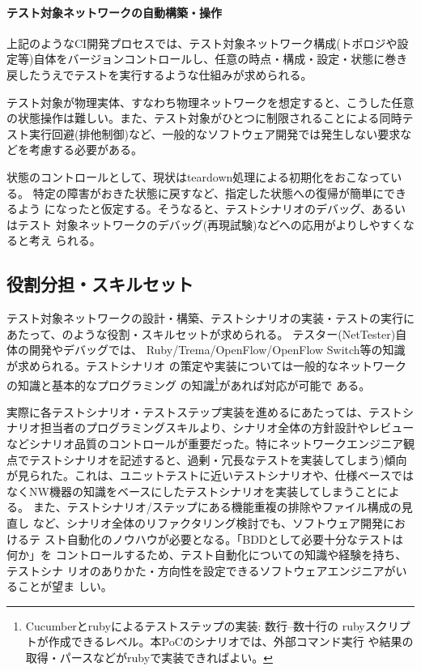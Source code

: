     \paragraph{テスト対象ネットワークの自動構築・操作}
上記のようなCI開発プロセスでは、テスト対象ネットワーク構成(トポロジや設
定等)自体をバージョンコントロールし、任意の時点・構成・設定・状態に巻き
戻したうえでテストを実行するような仕組みが求められる。

テスト対象が物理実体、すなわち物理ネットワークを想定すると、こうした任意
の状態操作は難しい。また、テスト対象がひとつに制限されることによる同時テ
スト実行回避(排他制御)など、一般的なソフトウェア開発では発生しない要求な
どを考慮する必要がある。

状態のコントロールとして、現状はteardown処理による初期化をおこなっている。
特定の障害がおきた状態に戻すなど、指定した状態への復帰が簡単にできるよう
になったと仮定する。そうなると、テストシナリオのデバッグ、あるいはテスト
対象ネットワークのデバッグ(再現試験)などへの応用がよりしやすくなると考え
られる。

  \subsection{役割分担・スキルセット}

テスト対象ネットワークの設計・構築、テストシナリオの実装・テストの実行に
あたって、のような役割・スキルセットが求められる。
テスター(NetTester)自体の開発やデバッグでは、
Ruby/Trema/OpenFlow/OpenFlow Switch等の知識が求められる。テストシナリオ
の策定や実装については一般的なネットワークの知識と基本的なプログラミング
の知識\footnote{Cucumberとrubyによるテストステップの実装: 数行--数十行の
rubyスクリプトが作成できるレベル。本PoCのシナリオでは、外部コマンド実行
や結果の取得・パースなどがrubyで実装できればよい。}があれば対応が可能で
ある。

実際に各テストシナリオ・テストステップ実装を進めるにあたっては、テストシ
ナリオ担当者のプログラミングスキルより、シナリオ全体の方針設計やレビュー
などシナリオ品質のコントロールが重要だった。特にネットワークエンジニア観
点でテストシナリオを記述すると、過剰・冗長なテストを実装してしまう)傾向
が見られた。これは、ユニットテストに近いテストシナリオや、仕様ベースでは
なくNW機器の知識をベースにしたテストシナリオを実装してしまうことによる。
また、テストシナリオ/ステップにある機能重複の排除やファイル構成の見直し
など、シナリオ全体のリファクタリング検討でも、ソフトウェア開発におけるテ
スト自動化のノウハウが必要となる。「BDDとして必要十分なテストは何か」を
コントロールするため、テスト自動化についての知識や経験を持ち、テストシナ
リオのありかた・方向性を設定できるソフトウェアエンジニアがいることが望ま
しい。

